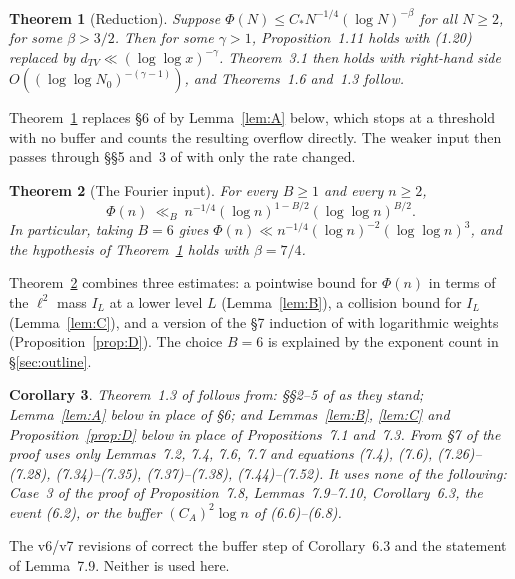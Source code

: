 \documentclass[11pt]{amsart}
\newtheorem{theorem}{Theorem}
\newtheorem{corollary}[theorem]{Corollary}
\theoremstyle{remark}
\newcommand{\Tc}{\cite{Tao22}}         %
\theoremstyle{plain}
\begin{document}
\begin{theorem}[Reduction]\label{thm:reduction}
Suppose $\Phi(N)\le C_*N^{-1/4}(\log N)^{-\beta}$ for all $N\ge2$, for some $\beta>3/2$. Then for some $\gamma>1$, Proposition~1.11 holds with (1.20) replaced by $d_{TV}\ll(\log\log x)^{-\gamma}$. Theorem~3.1 then holds with right-hand side $O((\log\log N_0)^{-(\gamma-1)})$, and Theorems~1.6 and~1.3 follow.
\end{theorem}

Theorem~\ref{thm:reduction} replaces \S6 of \Tc{} by Lemma~\ref{lem:A} below, which stops at a threshold with no buffer and counts the resulting overflow directly. The weaker input then passes through \S\S5 and~3 of \Tc{} with only the rate changed.

\begin{theorem}[The Fourier input]\label{thm:input}
For every $B\ge1$ and every $n\ge2$,
\[
\Phi(n)\ \ll_B\ n^{-1/4}(\log n)^{1-B/2}(\log\log n)^{B/2}.
\]
In particular, taking $B=6$ gives $\Phi(n)\ll n^{-1/4}(\log n)^{-2}(\log\log n)^3$, and the hypothesis of Theorem~\ref{thm:reduction} holds with $\beta=7/4$.
\end{theorem}

Theorem~\ref{thm:input} combines three estimates: a pointwise bound for $\Phi(n)$ in terms of the $\ell^2$ mass $I_L$ at a lower level $L$ (Lemma~\ref{lem:B}), a collision bound for $I_L$ (Lemma~\ref{lem:C}), and a version of the \S7 induction of \Tc{} with logarithmic weights (Proposition~\ref{prop:D}). The choice $B=6$ is explained by the exponent count in \S\ref{sec:outline}.

\begin{corollary}\label{cor:uses}
Theorem~1.3 of \Tc{} follows from: \S\S2--5 of \Tc{} as they stand; Lemma~\ref{lem:A} below in place of \S6; and Lemmas~\ref{lem:B}, \ref{lem:C} and Proposition~\ref{prop:D} below in place of Propositions~7.1 and~7.3. From \S7 of \Tc{} the proof uses only Lemmas~7.2, 7.4, 7.6, 7.7 and equations (7.4), (7.6), (7.26)--(7.28), (7.34)--(7.35), (7.37)--(7.38), (7.44)--(7.52). It uses none of the following: Case~3 of the proof of Proposition~7.8, Lemmas~7.9--7.10, Corollary~6.3, the event (6.2), or the buffer $(C_A)^2\log n$ of (6.6)--(6.8).
\end{corollary}

The v6/v7 revisions of \Tc{} correct the buffer step of Corollary~6.3 and the statement of Lemma~7.9. Neither is used here.
\end{document}

